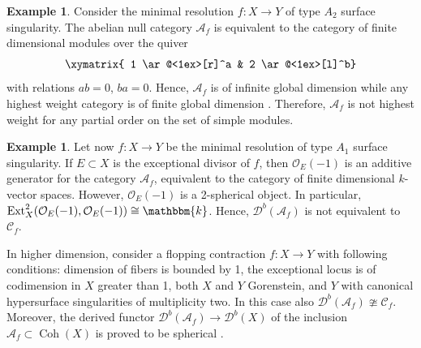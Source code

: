 \documentclass[12pt,a4paper]{amsart}
\newcommand{\cC}{{\mathcal{C}}}
\newcommand{\dD}{{\mathcal{D}}}
\newcommand{\oO}{{\mathcal{O}}}
\newcommand{\kk}{\mathbbm{k}}
\newcommand{\Ext}{\mathop{\operatorname{Ext}}\nolimits}
\newcommand{\Coh}{\mathop{\operatorname{Coh}}\nolimits}
\theoremstyle{definition}
\newtheorem{EXM}[LEM]{Example}
\begin{document}
\begin{EXM}\label{typeA2}
Consider the minimal resolution $f\colon X\to Y$ of type $A_2$ surface singularity. The abelian null category $\mathscr{A}_f$ is equivalent to the category of finite dimensional modules over the quiver
\[
\xymatrix{ 1 \ar@<1ex>[r]^a & 2 \ar@<1ex>[l]^b}
\]
with relations $ab =0 $, $ba=0$. Hence, $\mathscr{A}_f$ is of infinite global dimension while any highest weight category is of finite global dimension \cite{CPS}.
Therefore, $\mathscr{A}_f$ is not highest weight for any partial order on the set of simple modules.
\end{EXM}
\begin{EXM}\label{typeA1}
Let now $f\colon X\to Y$ be the minimal resolution of type $A_1$ surface singularity. If $E\subset X$ is the exceptional divisor of $f$, then $\oO_E(-1)$ is an additive generator for the category $\mathscr{A}_f$, equivalent to the category of finite dimensional $k$-vector spaces. However, $\oO_E(-1)$ is a 2-spherical object. In particular,  $\Ext^2_X(\oO_E(-1), \oO_E(-1)) \cong \kk$. Hence,  $\dD^b(\mathscr{A}_f)$ is not equivalent to $\cC_f$. 
\end{EXM}
In higher dimension, consider a flopping contraction $f\colon X\to Y$ with following conditions: dimension of fibers is bounded by 1, the exceptional locus is of codimension in $X$ greater than 1, both $X$ and $Y$ Gorenstein, and $Y$ with canonical hypersurface singularities of multiplicity two. In this case also $\dD^b(\mathscr{A}_f)\ncong \cC_f$. Moreover, the derived functor $\dD^b(\mathscr{A}_f) \to \dD^b(X)$ of the inclusion $\mathscr{A}_f\subset \Coh(X)$ is proved to be spherical \cite{BodBon}.
\end{document}
